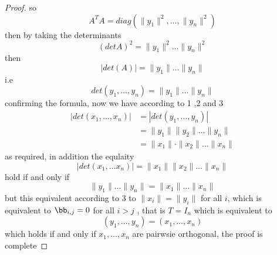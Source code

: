 \begin{proof}
so \[
A ^{T} A = 
diag (\| y_1 \| ^2 , \hdots , \| y _n  \| ^2 ) 
\]
then by taking the determinants
\[
	\left( detA \right)^2  = 
	\| y_1 \| ^2  \hdots  \| y _n   \| ^2 
\]
then 
\[
\left| det(A)  \right| = 
\| y_1 \| \hdots  \| y_n  \| 
\]
i.e 
\[
det (y_1, \hdots , y_n ) = 
\| y_1 \| \hdots  \| y_n  \| 
\]
confirming the formula, now we have according to 
1 ,2 and 3
\begin{align*}
	\left| det(x_1, \hdots , x_n   )  \right| & 
	= 
	\left| det(y_1, \hdots , y_n )  \right| \\
						  &=
						 \| y_1 \| 
		\| y_2 \|  \hdots  \| y_n  \| \\
	&= 
	\| x_1 \|  \cdot \| x_2 \|  \hdots 
	\| x_n  \| 
\end{align*}
as required, in addition the equlaity 
\[
	\left| det(x_1, \hdots  x_n )  \right| =
	\| x_1 \| \| x_2 \|  \hdots 
	\| x  _n \|  
\]
hold if and only if 
\[
	\| y_1 \| \hdots \| y_n  \|  = 
	\| x_1 \|  \hdots \| x _n  \| 
\]
but this equivalent according to $3 $ to 
$\| x_{i} \| = \| y_{i} \|  $  
for all $i $, which is equivalent to $\bb_{i,j}= 0 $  
for all $i > j $ , that is $T = I_{n} $ which is
equivalent to 
\[
\left( y_1, \hdots , y_n  \right) =
\left( x_1, \hdots , x_n  \right)
\]
which holds if and only if $x_1, \hdots , x_n  $  are
pairwsie orthogonal, the proof is complete
\end{proof}
% 


